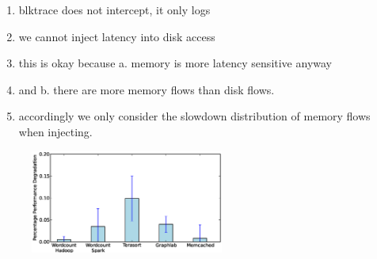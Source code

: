\begin{enumerate}
\item blktrace does not intercept, it only logs
\item we cannot inject latency into disk access
\item this is okay because a. memory is more latency sensitive anyway 
\item and b. there are more memory flows than disk flows.
\item accordingly we only consider the slowdown distribution of memory flows when injecting.
\end{enumerate}
\label{ssec:alp}

%
\begin{figure}
  \centering
    \includegraphics[width = 2.5in]{img/slowdown.eps} 
  \caption{\small{}}
  \label{fig:appfabric}
\end{figure}
%
